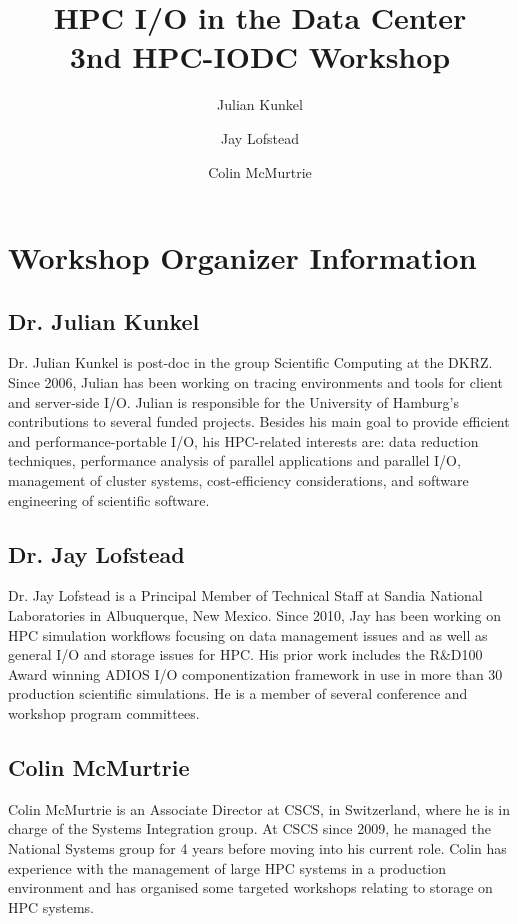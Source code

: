 \documentclass[a4paper,10pt]{article}
\title{HPC I/O in the Data Center\\ {\normalsize 3nd HPC-IODC Workshop}}
\author{Julian Kunkel \and Jay Lofstead \and Colin McMurtrie}
\begin{document}
\maketitle

\section{Workshop Organizer Information}

\subsection{Dr. Julian Kunkel}

Dr. Julian Kunkel is post-doc in the group Scientific Computing at the DKRZ.
Since 2006, Julian has been working on tracing environments and tools for client and server-side I/O.
Julian is responsible for the University of Hamburg's contributions to several funded projects.  
Besides his main goal to provide efficient and performance-portable I/O, his HPC-related interests are: data reduction techniques, performance analysis of parallel applications and parallel I/O, management of cluster systems, cost-efficiency considerations, and software engineering of scientific software.


\subsection{Dr. Jay Lofstead}

Dr. Jay Lofstead is a Principal Member of Technical Staff at Sandia National
Laboratories in Albuquerque, New Mexico. Since 2010, Jay has been working on
HPC simulation workflows focusing on data management issues and as well as
general I/O and storage issues for HPC.  His prior work includes the R\&D100
Award winning ADIOS I/O componentization framework in use in more than 30
production scientific simulations. He is a member of several conference and
workshop program committees.

\subsection{Colin McMurtrie}

Colin McMurtrie is an Associate Director at CSCS, in Switzerland, where he is in charge of the Systems Integration group.  At CSCS since 2009, he managed the National Systems group for 4 years before moving into his current role.  Colin has experience with the management of large HPC systems in a production environment and has organised some targeted workshops relating to storage on HPC systems.
\end{document}
